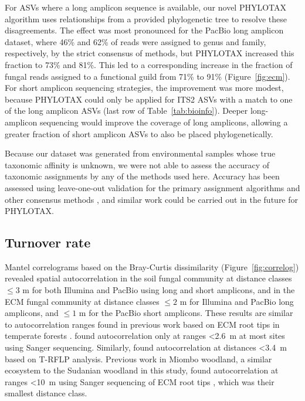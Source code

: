\documentclass[
  12pt,
]{article}
\begin{document}
For ASVs where a long amplicon sequence is available, our novel PHYLOTAX algorithm uses relationships from a provided phylogenetic tree to resolve these disagreements.
The effect was most pronounced for the PacBio long amplicon dataset,
where 46\% and 62\% of reads were assigned to genus and family, respectively, by the strict consensus of methods, but PHYLOTAX increased this fraction to 73\% and 81\%.
This led to a corresponding increase in the fraction of fungal reads assigned to a functional guild from 71\% to 91\% (Figure~\ref{fig:ecm}).
For short amplicon sequencing strategies, the improvement was more modest, because PHYLOTAX could only be applied for ITS2 ASVs with a match to one of the long amplicon ASVs (last row of Table~\ref{tab:bioinfo}).
Deeper long-amplicon sequencing would improve the coverage of long amplicons, allowing a greater fraction of short amplicon ASVs to also be placed phylogenetically.

Because our dataset was generated from environmental samples whose true taxonomic affinity is unknown, we were not able to assess the accuracy of taxonomic assignments by any of the methods used here.
Accuracy has been assessed using leave-one-out validation for the primary assignment algorithms \autocites[e.g.,][]{edgar2018,murali2018} and other consensus methods \autocites[e.g.,][]{gdanetz2017,somervuo2016}, and similar work could be carried out in the future for PHYLOTAX.

\hypertarget{turnover-rate}{%
\subsection{Turnover rate}\label{turnover-rate}}

Mantel correlograms based on the Bray-Curtis dissimilarity (Figure~\ref{fig:correlog}) revealed spatial autocorrelation in the soil fungal community at distance classes \(\le 3\) m for both Illumina and PacBio using long and short amplicons, and in the ECM fungal community at distance classes \(\le 2\) m for Illumina and PacBio long amplicons, and \(\le 1\) m for the PacBio short amplicons.
These results are similar to autocorrelation ranges found in previous work based on ECM root tips in temperate forests \autocite{lilleskov2004,pickles2012a}.
\textcite{lilleskov2004} found autocorrelation only at ranges \textless2.6~m at most sites using Sanger sequencing.
Similarly, \textcite{pickles2012a} found autocorrelation at distances \textless3.4~m based on T-RFLP analysis.
Previous work in Miombo woodland, a similar ecosystem to the Sudanian woodland in this study, found autocorrelation at ranges \textless10~m using Sanger sequencing of ECM root tips \autocite{tedersoo2011}, which was their smallest distance class.
\end{document}

